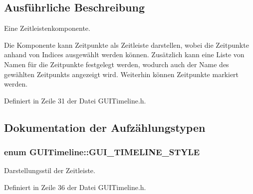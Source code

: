 \subsection{Ausführliche Beschreibung}
Eine Zeitleistenkomponente. 

Die Komponente kann Zeitpunkte als Zeitleiste darstellen, wobei die Zeitpunkte anhand von Indices ausgewählt werden können. Zusätzlich kann eine Liste von Namen für die Zeitpunkte festgelegt werden, wodurch auch der Name des gewählten Zeitpunkts angezeigt wird. Weiterhin können Zeitpunkte markiert werden. 

Definiert in Zeile 31 der Datei G\-U\-I\-Timeline.\-h.



\subsection{Dokumentation der Aufzählungstypen}
\hypertarget{classGUITimeline_a56f1cf170a8c077a0b94d19a0eba8c94}{
\subsubsection[{G\-U\-I\-\_\-\-T\-I\-M\-E\-L\-I\-N\-E\-\_\-\-S\-T\-Y\-L\-E}]{\setlength{\rightskip}{0pt plus 5cm}enum {\bf G\-U\-I\-Timeline\-::\-G\-U\-I\-\_\-\-T\-I\-M\-E\-L\-I\-N\-E\-\_\-\-S\-T\-Y\-L\-E}}}\label{classGUITimeline_a56f1cf170a8c077a0b94d19a0eba8c94}
Darstellungsstil der Zeitleiste. 

Definiert in Zeile 36 der Datei G\-U\-I\-Timeline.\-h.



